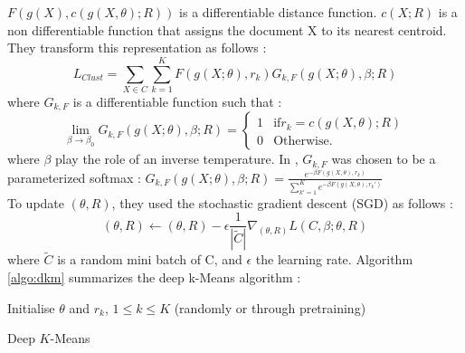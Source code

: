 $F(g(X),c(g(X, \theta); R))$ is a differentiable distance function.
$c(X ; R)$ is a non differentiable function that assigns the document X
to its nearest centroid.\\
They transform this representation as follows :
\begin{equation}
L_{Clust} = \sum_{X \in C}\sum_{k=1}^K F(g(X; \theta), r_k) G_{k, F}(g(X; \theta), \beta; R)
\end{equation}
where $G_{k, F}$ is a differentiable function such that :
\begin{equation}
  \lim\limits_{\beta \rightarrow \beta_0}G_{k, F}(g(X; \theta), \beta; R) = \left\{
\begin{array}{ll}
  1 & \mbox{if} r_k = c(g(X, \theta); R)\\
  0 & \mbox{Otherwise.}
\end{array}
\right.
\end{equation}
where $\beta$ play the role of an inverse temperature. In \cite{Deap-K-Means}
, $G_{k,F}$ was chosen to be a parameterized softmax : 
$G_{k, F}(g(X; \theta), \beta; R) = \frac{e^{-\beta F(g(X, \theta),r_k)}}
{\sum_{k' = 1}^K e^{-\beta F(g(X, \theta),r_k')}}$\\
To update $(\theta, R)$, they used the stochastic gradient descent (SGD)
as follows :
\begin{equation}
  (\theta, R) \gets (\theta, R) - \epsilon \frac{1}{|\widetilde{C}|}
  \nabla_{(\theta, R)} L(C, \beta; \theta, R)
\end{equation}
where $\widetilde{C}$ is a random mini batch of C, and $\epsilon$ the
learning rate.
Algorithm \ref{algo:dkm} summarizes the deep k-Means algorithm :
\begin{algorithm}[!h]
  Initialise $\theta$ and $r_k$, $1 \leq k \leq K$ (randomly or through 
  pretraining)\\
  \caption{\label{algo:dkm}Deep $K$-Means}
\end{algorithm}
